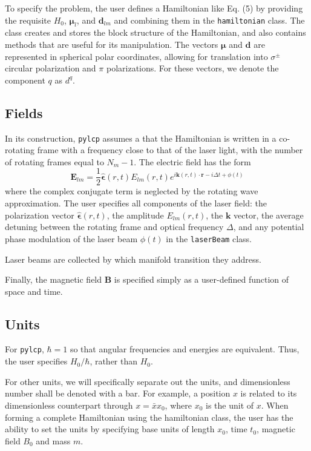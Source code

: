\documentclass[final,5p,times,twocolumn]{elsarticle}
\begin{document}
To specify the problem, the user defines a Hamiltonian like Eq. (5) by providing the requisite $H_0$, $\boldsymbol{\mu}_l$, and $\boldsymbol{d}_{lm}$ and combining them in the {\tt hamiltonian} class.  The class creates and stores the block structure of the Hamiltonian, and also contains methods that are useful for its manipulation.  The vectors $\boldsymbol{\mu}$ and $\boldsymbol{d}$ are represented in spherical polar coordinates, allowing for translation into $\sigma^{\pm}$ circular polarization and $\pi$ polarizations.  For these vectors, we denote the component $q$ as $d^q$.

\subsection{Fields}
In its construction, {\tt pylcp} assumes a that the Hamiltonian is written in a co-rotating frame with a frequency close to that of the laser light, with the number of rotating frames equal to $N_m-1$.  The electric field has the form
\begin{equation}
	\mathbf{E}_{lm} = \frac{1}{2}\hat{\boldsymbol{\epsilon}}(r, t) E_{lm}(r, t)e^{i\mathbf{k}(r,t)\cdot\mathbf{r}-i \Delta t + \phi(t)}
\end{equation}
where the complex conjugate term is neglected by the rotating wave approximation.  
The user specifies all components of the laser field: the polarization vector $\hat{\boldsymbol{\epsilon}}(r, t)$, the amplitude $E_{lm}(r, t)$, the $\mathbf{k}$ vector, the average detuning between the rotating frame and optical frequency $\Delta$,  and any potential phase modulation of the laser beam $\phi(t)$ in the {\tt laserBeam} class.

Laser beams are collected by which manifold transition they address.

Finally, the magnetic field $\mathbf{B}$ is specified simply as a user-defined function  of space and time.

\subsection{Units}

For {\tt pylcp}, $\hbar=1$ so that angular frequencies and energies are equivalent. Thus, the user specifies $H_0/\hbar$, rather than $H_0$.

For other units, we will specifically separate out the units, and dimensionless number shall be denoted with a bar.
For example, a position $x$ is related to its dimensionless counterpart through $x = \bar{x}x_0$, where $x_0$ is the unit of $x$.
When forming a complete Hamiltonian using the hamiltonian class, the user has the ability to set the units by specifying base units of length $x_0$, time $t_0$, magnetic field $B_0$ and mass $m$.  
\end{document}
